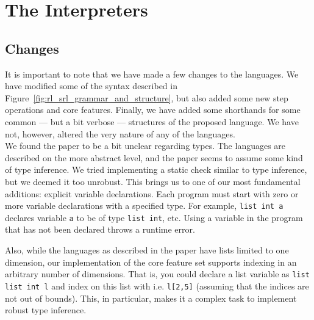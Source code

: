 
\section{The Interpreters}

\subsection{Changes}

%
%
%
%
%


It is important to note that we have made a few changes to the languages. We have modified some of the syntax described in Figure~\ref{fig:rl_srl_grammar_and_structure}, but also added some new step operations and core features. Finally, we have added some shorthands for some common --- but a bit verbose --- structures of the proposed language. We have not, however, altered the very nature of any of the languages.\\

\noindent We found the paper\cite{REV} to be a bit unclear regarding types. The languages are described on the more abstract level, and the paper seems to assume some kind of type inference. We tried implementing a static check similar to type inference, but we deemed it too unrobust. This brings us to one of our most fundamental additions: explicit variable declarations. Each program must start with zero or more variable declarations with a specified type. For example, \texttt{list int a} declares variable \texttt{a} to be of type \texttt{list int}, etc. Using a variable in the program that has not been declared throws a runtime error.

Also, while the languages as described in the paper have lists limited to one dimension, our implementation of the core feature set supports indexing in an arbitrary number of dimensions. That is, you could declare a list variable as \texttt{list list int l} and index on this list with i.e. \texttt{l[2,5]} (assuming that the indices are not out of bounds). This, in particular, makes it a complex task to implement robust type inference.\\

